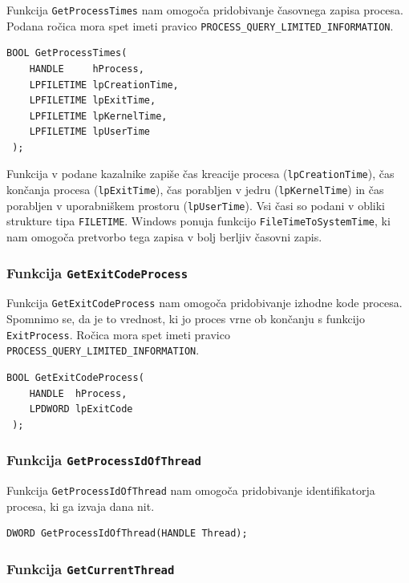 \documentclass[a4paper,12pt,openright]{book}
\begin{document}
Funkcija \texttt{GetProcessTimes} nam omogoča pridobivanje časovnega zapisa procesa.
Podana ročica mora spet imeti pravico \texttt{PROCESS\_QUERY\_LIMITED\-\_INFOR\-MATION}.

\begin{lstlisting}[style=func]
 BOOL GetProcessTimes(
	HANDLE     hProcess,
	LPFILETIME lpCreationTime,
	LPFILETIME lpExitTime,
	LPFILETIME lpKernelTime,
	LPFILETIME lpUserTime
 );
\end{lstlisting}

Funkcija v podane kazalnike zapiše čas kreacije procesa (\texttt{lpCreationTime}), čas končanja procesa (\texttt{lpExitTime}), čas porabljen v jedru (\texttt{lpKernelTime}) in čas porabljen v uporabniškem prostoru (\texttt{lpUserTime}).
Vsi časi so podani v obliki strukture tipa \texttt{FILETIME}.
Windows ponuja funkcijo \texttt{FileTimeToSystem\-Time}, ki nam omogoča pretvorbo tega zapisa v bolj berljiv časovni zapis.

\subsubsection{Funkcija \texttt{GetExitCodeProcess}}

Funkcija \texttt{GetExitCodeProcess} nam omogoča pridobivanje izhodne kode procesa.
Spomnimo se, da je to vrednost, ki jo proces vrne ob končanju s funkcijo \texttt{ExitProcess}.
Ročica mora spet imeti pravico \texttt{PROCESS\_QUERY\_LIMITED\-\_INFORMATION}.

\begin{lstlisting}[style=func]
 BOOL GetExitCodeProcess(
	HANDLE  hProcess,
	LPDWORD lpExitCode
 );
\end{lstlisting}

\subsubsection{Funkcija \texttt{GetProcessIdOfThread}}

Funkcija \texttt{GetProcessIdOfThread} nam omogoča pridobivanje identifikatorja procesa, ki ga izvaja dana nit.

\begin{lstlisting}[style=func]
 DWORD GetProcessIdOfThread(HANDLE Thread);
\end{lstlisting}

\subsubsection{Funkcija \texttt{GetCurrentThread}}
\end{document}
